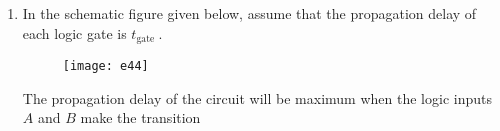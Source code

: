 \begin{enumerate}
\begin{figure}[H]
\end{figure}
\begin{tasks}(2)
\task[\textbf{A.}] \begin{figure}[H]
	\centering
	\texttt{[image: e41a]}
\end{figure}
\task[\textbf{B.}] \begin{figure}[H]
	\centering
	\texttt{[image: e41b]}
\end{figure}
\task[\textbf{C.}] \begin{figure}[H]
	\centering
	\texttt{[image: e41c]}
\end{figure}
\task[\textbf{D.}] \begin{figure}[H]
	\centering
	\texttt{[image: e41d]}
\end{figure}
\end{tasks}
\begin{answer}
\begin{align*}
D_{A}=\overline{x y} \oplus A
\end{align*}
\begin{align*}
\renewcommand*{\arraystretch}{1.5}
\begin{tabular}{|c|c|c|c|}
\hline
Input
$x \quad y$&Present
State A&Flip-Flop
Input $D_{A}$&Next State
$\mathrm{A}$\\
\hline
0 0&0&1&1\\
\hline
0 0&1&0&0\\
\hline
0 1&0&1&1\\
\hline
0 1&1&0&0\\
\hline
1 0&0&1&1\\
\hline
1 0& 1& 0&0\\
\hline
1 1&0&0&0\\
\hline
1 1&1&1&1\\
\hline
\end{tabular}
\end{align*}
So the correct answer is \textbf{Option (D)}
\end{answer}
	\item In the schematic figure given below, assume that the propagation delay of each logic gate is $t_{\text {gate }}$.\\
	\begin{figure}[H]
		\centering
		\texttt{[image: e44]}
	\end{figure}
	The propagation delay of the circuit will be maximum when the logic inputs $A$ and $B$ make the transition
	{}

\end{enumerate}
